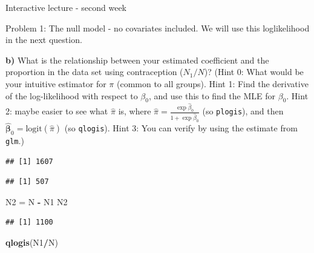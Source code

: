 \documentclass[
  ignorenonframetext,
]{beamer}
\newenvironment{Shaded}{\begin{snugshade}}{\end{snugshade}}
\newcommand{\FunctionTok}[1]{\textcolor[rgb]{0.13,0.29,0.53}{\textbf{#1}}}
\newcommand{\NormalTok}[1]{#1}
\newcommand{\OtherTok}[1]{\textcolor[rgb]{0.56,0.35,0.01}{#1}}
\newcommand{\SpecialCharTok}[1]{\textcolor[rgb]{0.81,0.36,0.00}{\textbf{#1}}}
\begin{document}
\begin{frame}[fragile]{Interactive lecture - second week}
\begin{block}{Problem 1: The null model - no covariates included.}
We will use this loglikelihood in the next question.

\textbf{b)} What is the relationship between your estimated coefficient
and the proportion in the data set using contraception (\(N_1/N\))?
(Hint 0: What would be your intuitive estimator for \(\pi\) (common to
all groups). Hint 1: Find the derivative of the log-likelihood with
respect to \(\beta_0\), and use this to find the MLE for \(\beta_0\).
Hint 2: maybe easier to see what \(\hat{\pi}\) is, where
\(\hat{\pi}=\frac{\exp{\hat{\beta}_0}}{1+\exp{\hat{\beta}_0}}\) (so
\texttt{plogis}), and then
\(\hat{\boldsymbol{\beta}}_0=\text{logit}(\hat{\pi})\) (so
\texttt{qlogis}). Hint 3: You can verify by using the estimate from
\texttt{glm}.)

\begin{Shaded}
\end{Shaded}

\begin{verbatim}
## [1] 1607
\end{verbatim}

\begin{Shaded}
\end{Shaded}

\begin{verbatim}
## [1] 507
\end{verbatim}

\begin{Shaded}
\begin{Highlighting}[]
\NormalTok{N2 }\OtherTok{=}\NormalTok{ N }\SpecialCharTok{{-}}\NormalTok{ N1}
\NormalTok{N2}
\end{Highlighting}
\end{Shaded}

\begin{verbatim}
## [1] 1100
\end{verbatim}

\begin{Shaded}
\begin{Highlighting}[]
\FunctionTok{qlogis}\NormalTok{(N1}\SpecialCharTok{/}\NormalTok{N)}
\end{Highlighting}
\end{Shaded}


\end{block}
\end{frame}
\end{document}
